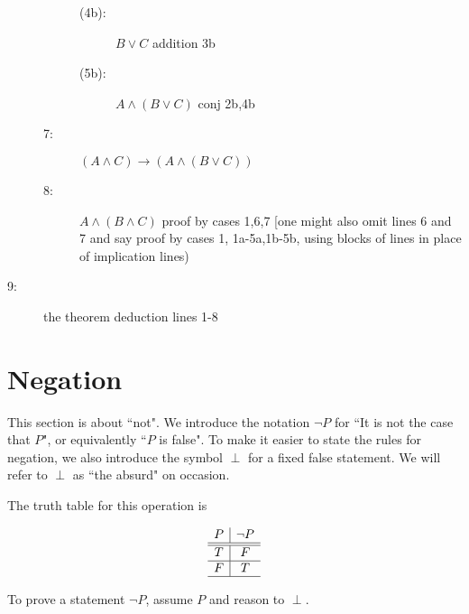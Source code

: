 \documentclass[12pt]{article}
\begin{document}
\begin{description}
\begin{description}
\begin{description}
\item [(4b):]  $B \vee C$ addition 3b

\item [(5b):]  $A \wedge (B \vee C)$  conj 2b,4b

\end{description}

\item[7:]  $(A \wedge C) \rightarrow (A \wedge( B \vee C))$

\item[8:]  $A \wedge (B \wedge C)$ proof by cases 1,6,7 [one might also omit lines 6 and 7 and say proof by cases 1, 1a-5a,1b-5b, using blocks of lines in place of implication lines)


\end{description}

\item[9:]  the theorem deduction lines 1-8

\end{description}


\newpage

\section{Negation}

This section is about ``not".  We introduce the notation $\neg P$ for ``It is not the case that $P$", or equivalently ``$P$ is false".   To make it easier to state the rules for negation,
we also introduce the symbol $\perp$ for a fixed false statement.  We will refer to $\perp$ as ``the absurd" on occasion.

The truth table for this operation is

$$\begin{array}{c|c}

P &  \neg P \\ \hline \hline

T & F \\ \hline

F & T \\ \hline

\end{array}$$

To prove a statement $\neg P$, assume $P$ and reason to $\perp$.
\end{document}
